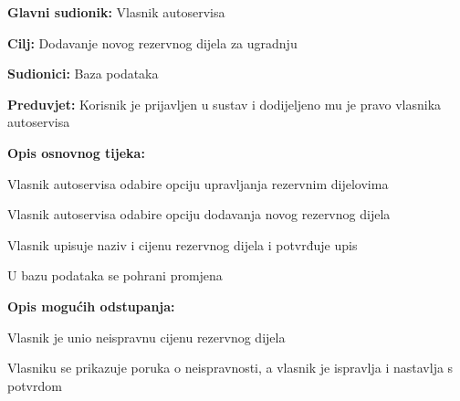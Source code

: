 \noindent {}
\begin{packed_item}

	\item \textbf{Glavni sudionik: } Vlasnik autoservisa
	\item  \textbf{Cilj:} Dodavanje novog rezervnog dijela za ugradnju
	\item  \textbf{Sudionici:} Baza podataka
	\item  \textbf{Preduvjet:} Korisnik je prijavljen u sustav i dodijeljeno
	mu je pravo vlasnika autoservisa
	\item  \textbf{Opis osnovnog tijeka:}

	\item[] \begin{packed_enum}

		\item Vlasnik autoservisa odabire opciju upravljanja rezervnim dijelovima
		\item Vlasnik autoservisa odabire opciju dodavanja novog rezervnog dijela
		\item Vlasnik upisuje naziv i cijenu rezervnog dijela i potvrđuje upis
		\item U bazu podataka se pohrani promjena

	\end{packed_enum}

	\item  \textbf{Opis mogućih odstupanja:}
	\item[] \begin{packed_item}
		\item[3.a] Vlasnik je unio neispravnu cijenu rezervnog dijela
		\item[] \begin{packed_enum}
			\item Vlasniku se prikazuje poruka o neispravnosti, a vlasnik je
			ispravlja i nastavlja s potvrdom
		\end{packed_enum}
	\end{packed_item}

\end{packed_item}

